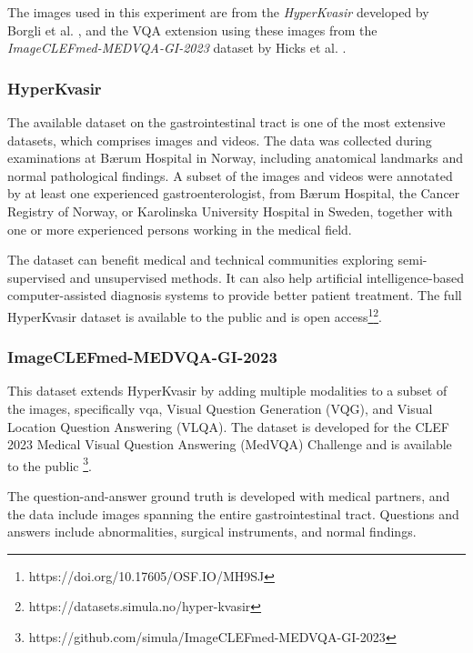         The images used in this experiment are from the \textit{HyperKvasir} developed by Borgli et al. \cite{borgliHyperKvasirComprehensiveMulticlass2020}, and the VQA extension using these images from the \textit{ImageCLEFmed-MEDVQA-GI-2023} dataset by Hicks et al. \cite{hicksImageCLEFmedMEDVQAGI20232023, hicksImageCLEFmedMEDVQAGIImageCLEF}. 
        
        \subsubsection{HyperKvasir}
        The available dataset on the gastrointestinal tract is one of the most extensive datasets, which comprises images and videos. The data was collected during examinations at Bærum Hospital in Norway, including anatomical landmarks and normal pathological findings.
        A subset of the images and videos were annotated by at least one experienced gastroenterologist, from Bærum Hospital, the Cancer Registry of Norway, or Karolinska University Hospital in Sweden, together with one or more experienced persons working in the medical field.  
        
        The dataset can benefit medical and technical communities exploring semi-supervised and unsupervised methods. It can also help artificial intelligence-based computer-assisted diagnosis systems to provide better patient treatment.
        The full HyperKvasir dataset is available to the public and is open access\footnote{https://doi.org/10.17605/OSF.IO/MH9SJ}\footnote{https://datasets.simula.no/hyper-kvasir}.


      
        \subsubsection{ImageCLEFmed-MEDVQA-GI-2023}

        This dataset extends HyperKvasir by adding multiple modalities to a subset of the images, specifically \gls{vqa}, Visual Question Generation (VQG), and Visual Location Question Answering (VLQA).
        The dataset is developed for the CLEF 2023 Medical Visual Question Answering (MedVQA) Challenge and is available to the public \footnote{https://github.com/simula/ImageCLEFmed-MEDVQA-GI-2023}.
        
        The  question-and-answer ground truth is developed with medical partners, and the data include images spanning the entire gastrointestinal tract. Questions and answers include abnormalities, surgical instruments, and normal findings. 
        
